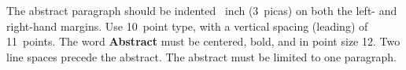 The abstract paragraph should be indented ~inch (3~picas) on
both the left- and right-hand margins. Use 10~point type, with a vertical
spacing (leading) of 11~points.  The word \textbf{Abstract} must be centered,
bold, and in point size 12. Two line spaces precede the abstract. The abstract
must be limited to one paragraph.
